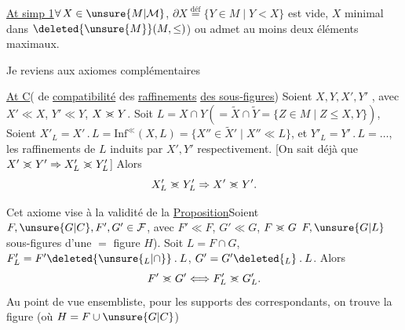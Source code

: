 \uline{At simp 1}\quad $\forall\,X\in\unsure{M|\mathcal M}$,   $\partial X\overset{\mathrm{déf}}{=}\{Y\in M\mid Y<X\}$ est vide,   $X$ minimal dans $\deleted{\unsure{M}}(M,\leq)$) ou admet au moins deux éléments maximaux.

Je reviens aux axiomes complémentaires

\uline{At C}\quad ( de \uline{compatibilité} des \uline{raffinements} \uline{des sous-figures}) Soient $X,Y,X',Y'$ , avec $X'\ll X$, $Y'\ll Y$, $X\mathrel{>\mkern-12mu<}Y$. Soit $L=X\cap Y\left(=\widetilde X\cap\widetilde Y=\{Z\in M\mid Z\leq X,Y\}\right)$, Soient
$X'_L=X'\mathbin{.}L=\mathrm{Inf}^{\ll}(X,L)=\{X''\in\widetilde X'\mid X''\ll L\}$, et $Y'_L=Y'\mathbin{.}L=\ldots$, les raffinements de $L$ induits par $X',Y'$ respectivement.  [On sait déjà que $X'\mathrel{>\mkern-12mu<}Y'\Rightarrow X'_L\mathrel{>\mkern-12mu<}Y'_L$] Alors
\[
X'_L\mathrel{>\mkern-12mu<}Y'_L\Rightarrow X'\mathrel{>\mkern-12mu<}Y'.
\]

Cet axiome vise à la validité de la
\uline{Proposition}\quad Soient $F,\unsure{G|C},F',G'\in\mathcal{F}$, avec $F'\ll F$, $G'\ll G$, $F\mathrel{>\mkern-12mu<}G$  $F,\unsure{G|L}$ sous-figures d'une $=$ figure $H$). Soit $L=F\cap G$, $F'_L=F'\deleted{\unsure{{}_L|\cap}}\mathbin{.}L$, $G'=G'\deleted{{}_L}\mathbin{.}L$. Alors
\[
F'\mathrel{>\mkern-12mu<}G'\Longleftrightarrow F'_L\mathrel{>\mkern-12mu<}G'_L.
\]
Au point de vue ensembliste, pour les supports des  correspondants, on trouve la figure  (où $H=F\cup\unsure{G|C}$)


